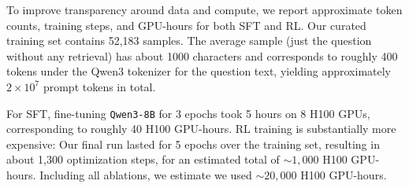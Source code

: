 To improve transparency around data and compute, we report approximate token counts, training steps, and GPU-hours for both SFT and RL. Our curated \ourdataset training set contains 52,183 samples. The average sample (just the question without any retrieval) has about 1000 characters and corresponds to roughly 400 tokens under the Qwen3 tokenizer for the question text, yielding approximately \(2\times 10^{7}\) prompt tokens in total.

For SFT, fine-tuning \texttt{Qwen3-8B} for 3 epochs took 5 hours on 8 \textsc{H100} GPUs, corresponding to roughly 40 \textsc{H100} GPU-hours. RL training is substantially more expensive: Our final run lasted for 5 epochs over the training set, resulting in about 1{,}300 optimization steps, for an estimated total of \(\sim 1{,}000\) \textsc{H100} GPU-hours. Including all ablations, we estimate we used \(\sim 20{,}000\) \textsc{H100} GPU-hours.

\clearpage